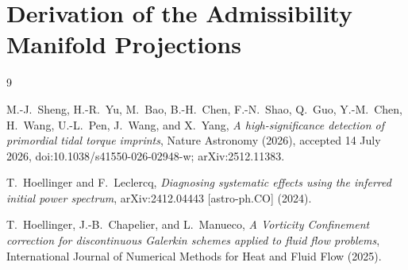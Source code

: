 \documentclass[12pt,a4paper,twoside,openright]{book}
\theoremstyle{plain}
\theoremstyle{definition}
\theoremstyle{remark}
\begin{document}
\section{Derivation of the Admissibility Manifold Projections}


\cleardoublepage
{}
{}
\begin{thebibliography}{9}

M.-J.~Sheng, H.-R.~Yu, M.~Bao, B.-H.~Chen, F.-N.~Shao, Q.~Guo, Y.-M.~Chen, H.~Wang, U.-L.~Pen, J.~Wang, and X.~Yang,
\emph{A high-significance detection of primordial tidal torque imprints},
Nature Astronomy (2026), accepted 14 July 2026,
doi:10.1038/s41550-026-02948-w; arXiv:2512.11383.

T.~Hoellinger and F.~Leclercq,
\emph{Diagnosing systematic effects using the inferred initial power spectrum},
arXiv:2412.04443 [astro-ph.CO] (2024).

T.~Hoellinger, J.-B.~Chapelier, and L.~Manueco,
\emph{A Vorticity Confinement correction for discontinuous Galerkin schemes applied to fluid flow problems},
International Journal of Numerical Methods for Heat and Fluid Flow (2025).

\end{thebibliography}

\end{document}
